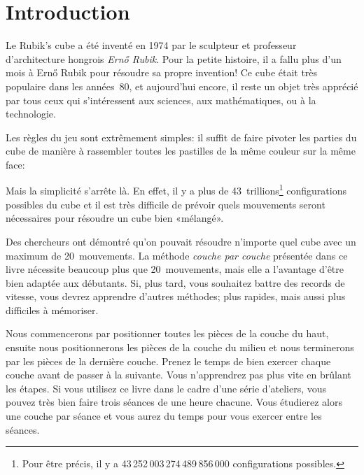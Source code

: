 \chapter{Introduction}

Le Rubik's cube a été inventé en 1974 par le sculpteur et professeur d'architecture hongrois \emph{Ernő Rubik}. Pour la petite histoire, il a fallu plus d'un mois à Ernő Rubik pour résoudre sa propre invention! Ce cube était très populaire
dans les années~80, et aujourd'hui encore, il reste un objet très apprécié
par tous ceux qui s'intéressent aux sciences, aux mathématiques, ou à la technologie.

Les règles du jeu sont extrêmement simples: il suffit de faire pivoter les parties du cube de manière à rassembler toutes les pastilles de la même couleur sur la même face:

\begin{center}
	\RubikCubeSolved
\end{center}


Mais la simplicité s'arrête là. En effet, il y a plus de 43~trillions\footnote{Pour être précis, il y a 43\,252\,003\,274\,489\,856\,000 configurations possibles.} configurations possibles du cube et il est très difficile de prévoir quels mouvements seront nécessaires pour résoudre un cube bien «mélangé».

Des chercheurs ont démontré\cite{god20} qu'on pouvait résoudre n'importe quel cube avec un maximum de 20~mouvements. La méthode \emph{couche par couche} présentée dans ce livre nécessite beaucoup plus que 20~mouvements, mais elle a l'avantage d'être bien adaptée aux débutants. Si, plus
tard, vous souhaitez battre des records de vitesse, vous devrez apprendre
d'autres méthodes; plus rapides, mais aussi plus difficiles à mémoriser.
 
Nous commencerons par positionner toutes les pièces de la couche du haut, ensuite nous positionnerons les pièces de la couche du milieu et nous terminerons par les pièces de la dernière
couche. Prenez le temps de bien exercer chaque couche avant de passer
à la suivante. Vous n'apprendrez pas plus vite en brûlant les étapes. Si vous utilisez ce livre dans le cadre d'une série d'ateliers, vous pouvez très bien faire trois
séances de une heure chacune. Vous étudierez alors une couche par séance et vous aurez du temps pour vous exercer entre les séances. 

